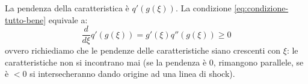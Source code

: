 \documentclass[10pt,a4paper,twoside,openright]{book}
\begin{document}
\begin{nb}
	La pendenza della caratteristica è $\displaystyle q'( g( \xi )) .$ La condizione \eqref{eq:condizione-tutto-bene} equivale a:
	\begin{equation*}
		\frac{d}{d\xi } q'( g( \xi )) =g'( \xi ) q''( g( \xi )) \geqslant 0
	\end{equation*}
	ovvero richiediamo che le pendenze delle caratteristiche siano crescenti con $\displaystyle \xi $: le caratteristiche non si incontrano mai (se la pendenza è $\displaystyle 0$, rimangono parallele, se è $\displaystyle < 0$ si intersecheranno dando origine ad una linea di shock).

	\begin{figure}[H]
		\centering

	\begin{tikzpicture}[x=0.75pt,y=0.75pt,yscale=-1,xscale=1]


\end{tikzpicture}
\end{figure}
\end{nb}
\end{document}
